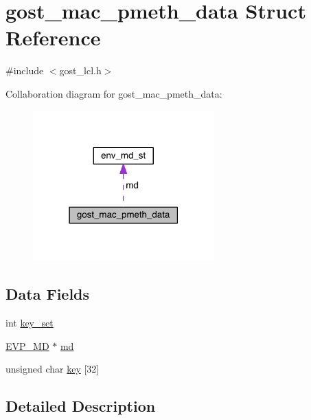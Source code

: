\hypertarget{structgost__mac__pmeth__data}{}\section{gost\+\_\+mac\+\_\+pmeth\+\_\+data Struct Reference}
\label{structgost__mac__pmeth__data}


{\ttfamily \#include $<$gost\+\_\+lcl.\+h$>$}



Collaboration diagram for gost\+\_\+mac\+\_\+pmeth\+\_\+data\+:\nopagebreak
\begin{figure}[H]
\begin{center}
\leavevmode
\includegraphics[width=198pt]{structgost__mac__pmeth__data__coll__graph}
\end{center}
\end{figure}
\subsection*{Data Fields}
\begin{DoxyCompactItemize}
\item 
int \hyperlink{structgost__mac__pmeth__data_a77761b1f4ad7895ba894c134c03b98df}{key\+\_\+set}
\item 
\hyperlink{crypto_2ossl__typ_8h_aac66cf010326fa9a927c2a34888f45d3}{E\+V\+P\+\_\+\+MD} $\ast$ \hyperlink{structgost__mac__pmeth__data_a53c8a7a6089e9083cf1822014950084d}{md}
\item 
unsigned char \hyperlink{structgost__mac__pmeth__data_ad4cac93cc3b317b801edca4af3b610d3}{key} \mbox{[}32\mbox{]}
\end{DoxyCompactItemize}


\subsection{Detailed Description}


